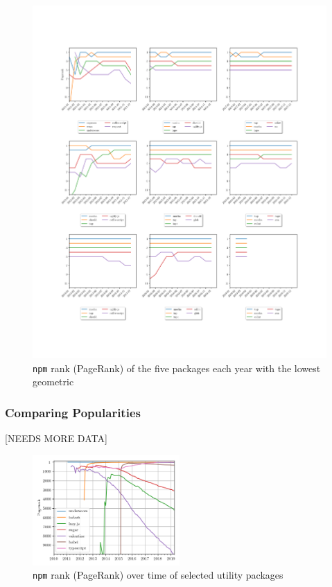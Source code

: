 \documentclass[10pt,conference]{IEEEtran}
\def\code#1{\texttt{#1}}
\begin{document}
\begin{figure}
  \includegraphics[width=1\textwidth]{figures/highest_ranked.pdf}
  \caption{\code{npm} rank (PageRank) of the five packages each year with the lowest geometric}
  \label{ranksByYear}
\end{figure}

\subsubsection{Comparing Popularities}
[NEEDS MORE DATA]

\begin{figure}
  \includegraphics[width=0.5\textwidth]{figures/select_packages.png}
  \caption{\code{npm} rank (PageRank) over time of selected utility packages}
  \label{selectPackages}
\end{figure}
\end{document}
